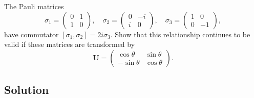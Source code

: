 \documentclass[12pt]{article}
\begin{document}
The Pauli matrices
\[
    \sigma_1=\left(\begin{array}{ll}
            0 & 1 \\
            1 & 0
        \end{array}\right), \quad \sigma_2=\left(\begin{array}{cc}
            0 & -i \\
            i & 0
        \end{array}\right), \quad \sigma_3=\left(\begin{array}{rr}
            1 & 0  \\
            0 & -1
        \end{array}\right),
\]
have commutator \(\left[\sigma_1, \sigma_2\right]=2 i \sigma_3\). Show that this relationship continues to be valid if these matrices are transformed by
\[
    \mathbf{U}=\left(\begin{array}{rr}
            \cos \theta  & \sin \theta \\
            -\sin \theta & \cos \theta
        \end{array}\right) .
\]

\subsection{Solution}



\newpage


\nocite{El-Deeb_PEU-356_Assignments}
\end{document}
